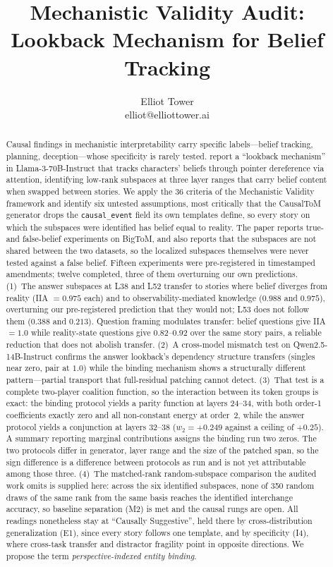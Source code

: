 \documentclass{article}
\title{Mechanistic Validity Audit: Lookback Mechanism for Belief Tracking}
\author{\name Elliot Tower \\
      \email elliot@elliottower.ai}
\begin{document}
\maketitle

\begin{abstract}
Causal findings in mechanistic interpretability carry specific labels---belief tracking, planning, deception---whose specificity is rarely tested. \citet{prakash2025lookback} report a ``lookback mechanism'' in Llama-3-70B-Instruct that tracks characters' beliefs through pointer dereference via attention, identifying low-rank subspaces at three layer ranges that carry belief content when swapped between stories. We apply the 36 criteria of the Mechanistic Validity framework and identify six untested assumptions, most critically that the CausalToM generator drops the \texttt{causal\_event} field its own templates define, so every story on which the subspaces were identified has belief equal to reality. The paper reports true- and false-belief experiments on BigToM, and also reports that the subspaces are not shared between the two datasets, so the localized subspaces themselves were never tested against a false belief. Fifteen experiments were pre-registered in timestamped amendments; twelve completed, three of them overturning our own predictions. (1)~The answer subspaces at L38 and L52 transfer to stories where belief diverges from reality (IIA $= 0.975$ each) and to observability-mediated knowledge ($0.988$ and $0.975$), overturning our pre-registered prediction that they would not; L53 does not follow them ($0.388$ and $0.213$). Question framing modulates transfer: belief questions give IIA $= 1.0$ while reality-state questions give $0.82$--$0.92$ over the same story pairs, a reliable reduction that does not abolish transfer. (2)~A cross-model mismatch test on Qwen2.5-14B-Instruct confirms the answer lookback's dependency structure transfers (singles near zero, pair at $1.0$) while the binding mechanism shows a structurally different pattern---partial transport that full-residual patching cannot detect. (3)~That test is a complete two-player coalition function, so the interaction between its token groups is exact: the binding protocol yields a parity function at layers 24--34, with both order-1 coefficients exactly zero and all non-constant energy at order~2, while the answer protocol yields a conjunction at layers 32--38 ($w_2 = +0.249$ against a ceiling of $+0.25$). A summary reporting marginal contributions assigns the binding run two zeros. The two protocols differ in generator, layer range and the size of the patched span, so the sign difference is a difference between protocols as run and is not yet attributable among those three. (4)~The matched-rank random-subspace comparison the audited work omits is supplied here: across the six identified subspaces, none of 350 random draws of the same rank from the same basis reaches the identified interchange accuracy, so baseline separation (M2) is met and the causal rungs are open. All readings nonetheless stay at ``Causally Suggestive'', held there by cross-distribution generalization (E1), since every story follows one template, and by specificity (I4), where cross-task transfer and distractor fragility point in opposite directions. We propose the term \emph{perspective-indexed entity binding}.

\end{abstract}
\end{document}
